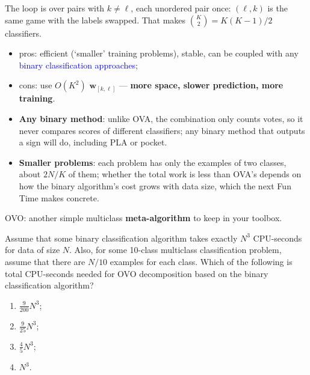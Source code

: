 The loop is over pairs with \(k \neq \ell\), each unordered pair once: \((\ell,
k)\) is the same game with the labels swapped. That makes \(\binom{K}{2} =
K(K-1)/2\) classifiers.

\begin{itemize}
    \item pros: efficient (`smaller' training problems), stable, can be coupled
        with any \textcolor{blue}{binary classification approaches};
    \item cons: use \(O(K^2)\) \(\bm{w}_{[k, \ell]}\) ---
        \textcolor{orange!85!black}{\textbf{more space, slower prediction, more
        training}}.
\end{itemize}

\begin{itemize}
    \item \textbf{Any binary method}: unlike OVA, the combination only counts
        votes, so it never compares scores of different classifiers; any
        binary method that outputs a sign will do, including PLA or pocket.
    \item \textbf{Smaller problems}: each problem has only the examples of two
        classes, about \(2N/K\) of them; whether the total work is less than
        OVA's depends on how the binary algorithm's cost grows with data size,
        which the next Fun Time makes concrete.
\end{itemize}

\begin{moral}
    OVO: another simple multiclass
    \textcolor{orange!85!black}{\textbf{meta-algorithm}} to keep in your
    toolbox.
\end{moral}

\begin{exercise}
    Assume that some binary classification algorithm takes exactly \(N^3\)
    CPU-seconds for data of size \(N\). Also, for some 10-class multiclass
    classification problem, assume that there are \(N/10\) examples for each
    class. Which of the following is total CPU-seconds needed for OVO
    decomposition based on the binary classification algorithm?
    \begin{enumerate}[(1)]
        \item \(\frac{9}{200} N^3\);
        \item \(\frac{9}{25} N^3\);
        \item \(\frac{4}{5} N^3\);
        \item \(N^3\).
    \end{enumerate}
\end{exercise}

